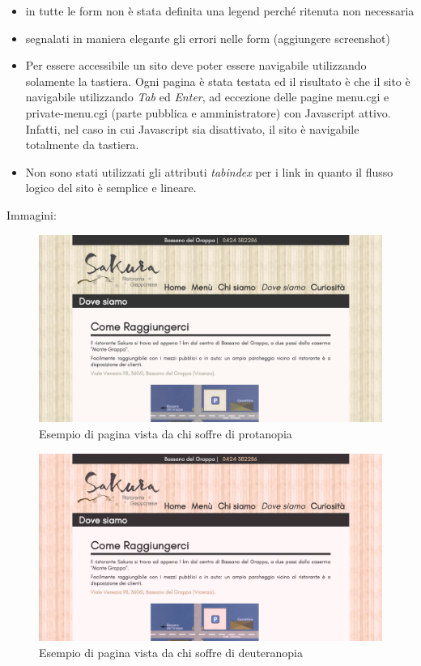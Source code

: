 \documentclass[../relazione.tex]{subfiles}
\begin{document}
\begin{itemize}
		\item in tutte le form non è stata definita una legend perché ritenuta non necessaria
		\item segnalati in maniera elegante gli errori nelle form (aggiungere screenshot)
		\item Per essere accessibile un sito deve poter essere navigabile utilizzando solamente la tastiera. Ogni pagina è stata testata ed il risultato è che il sito è navigabile utilizzando \textit{Tab} ed \textit{Enter}, ad eccezione delle pagine menu.cgi e private-menu.cgi (parte pubblica e amministratore) con Javascript attivo. Infatti, nel caso in cui Javascript sia disattivato, il sito è navigabile totalmente da tastiera.
		\item Non sono stati utilizzati gli attributi \textit{tabindex} per i link in quanto il flusso logico del sito è semplice e lineare.
	\end{itemize}
	Immagini:
	\begin{figure}[H]
	\centering
		\includegraphics[width=\textwidth]{images/colorblindness/protanopia}
		\caption{Esempio di pagina vista da chi soffre di protanopia}
		\label{fig:Esempio di pagina vista da chi soffre di protanopia}
	\end{figure}
	\begin{figure}[H]
	\centering
		\includegraphics[width=\textwidth]{images/colorblindness/deuteranopia}
		\caption{Esempio di pagina vista da chi soffre di deuteranopia}
		\label{fig:Esempio di pagina vista da chi soffre di deuteranopia}
	\end{figure}
\end{document}
